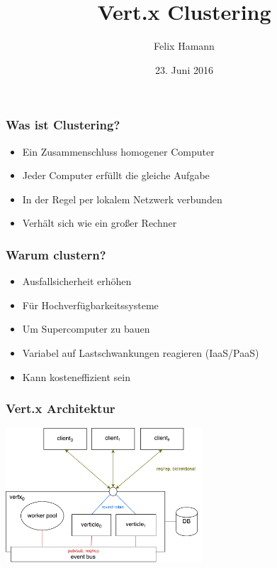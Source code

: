 \documentclass{beamer}
\begin{document}
\title{Vert.x Clustering}
\author{Felix Hamann}
\date{23. Juni 2016}


\begin{frame}
\titlepage
\end{frame}


\begin{frame}
  \frametitle{Was ist Clustering?}

  \begin{itemize}
    \item Ein Zusammenschluss homogener Computer
    \item Jeder Computer erfüllt die gleiche Aufgabe
    \item In der Regel per lokalem Netzwerk verbunden
    \item Verhält sich wie ein großer Rechner
  \end{itemize}

\end{frame}


\begin{frame}
  \frametitle{Warum clustern?}

  \begin{itemize}
    \item Ausfallsicherheit erhöhen
    \item Für Hochverfügbarkeitssysteme
    \item Um Supercomputer zu bauen
    \item Variabel auf Lastschwankungen reagieren (IaaS/PaaS)
    \item Kann kosteneffizient sein
  \end{itemize}

\end{frame}


\begin{frame}
  \frametitle{Vert.x Architektur}
  \vspace{1cm}

  \begin{center}
    \includegraphics[height=5cm]{src/single_deployment.pdf}
  \end{center}
\end{frame}
\end{document}
